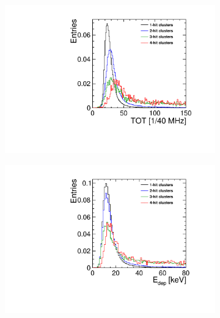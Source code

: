 \begin{figure}[htbp] \centering
  \begin{subfigure}[b]{0.32\textwidth}
    \includegraphics[width=\textwidth]{./figures/Calibration/TOT_Clusters_W0019_G07.pdf}
    \caption{}
  \end{subfigure}\hfill
  \begin{subfigure}[b]{0.32\textwidth}
    \includegraphics[width=\textwidth]{./figures/Calibration/Edep_Clusters_W0019_G07.pdf}
    \caption{}
  \end{subfigure}\hfill
  \begin{subfigure}[b]{0.32\textwidth}

\end{subfigure}
\end{figure}
